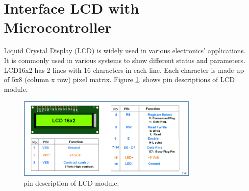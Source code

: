 \documentclass[12pt, a4paper, twoside]{report}
\begin{document}
\section{Interface LCD with Microcontroller} 
Liquid Crystal Display (LCD) is widely used in various electronics’ applications. It is commonly used in various systems to show different status and parameters. LCD16x2 has 2 lines with 16 characters in each line. Each character is made up of 5x8 (column x row) pixel matrix. Figure \ref{fig:hardware-3}, shows pin descriptions of LCD module.
\begin{figure}[!h]
	\centering
	\includegraphics[width=0.8\textwidth]
	{images/chapter6/hardware-3}
	\caption{pin description of LCD module.}
	\label{fig:hardware-3}
\end{figure}
\end{document}
